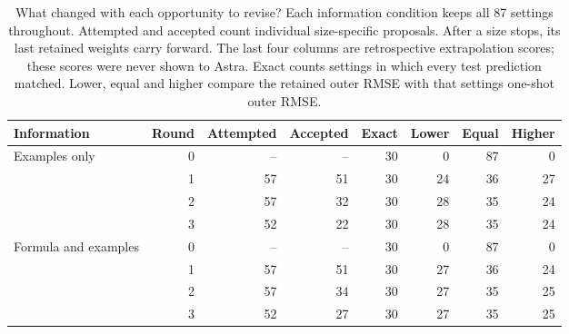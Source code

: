 \begin{table}[htbp]\centering\small
\caption{What changed with each opportunity to revise? Each information condition keeps all 87 settings throughout. Attempted and accepted count individual size-specific proposals. After a size stops, its last retained weights carry forward. The last four columns are retrospective extrapolation scores; these scores were never shown to Astra. Exact counts settings in which every test prediction matched. Lower, equal and higher compare the retained outer RMSE with that setting\textquotesingle s one-shot outer RMSE.}\label{tab:iterrounds}
\begin{tabular}{@{}lrrrrrrr@{}}\toprule
Information & Round & Attempted & Accepted & Exact & Lower & Equal & Higher\\\midrule
Examples only & 0 & -- & -- & 30 & 0 & 87 & 0\\
 & 1 & 57 & 51 & 30 & 24 & 36 & 27\\
 & 2 & 57 & 32 & 30 & 28 & 35 & 24\\
 & 3 & 52 & 22 & 30 & 28 & 35 & 24\\
\midrule
Formula and examples & 0 & -- & -- & 30 & 0 & 87 & 0\\
 & 1 & 57 & 51 & 30 & 27 & 36 & 24\\
 & 2 & 57 & 34 & 30 & 27 & 35 & 25\\
 & 3 & 52 & 27 & 30 & 27 & 35 & 25\\
\bottomrule\end{tabular}\end{table}
